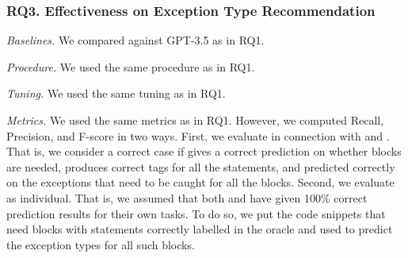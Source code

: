 \subsubsection{RQ3. Effectiveness on Exception Type Recommendation}

{\em Baselines.} We compared {\xtype} against GPT-3.5 as in RQ1.



{\em Procedure.} We used the same procedure as in RQ1.


{\em Tuning.} We used the same tuning as in RQ1.

{\em Metrics.} We used the same metrics as in RQ1. However, we
computed Recall, Precision, and F-score in two ways. First, we
evaluate {\xtype} in connection with {\xblock} and {\xstate}. That is,
we consider a correct case if {\xblock} gives a correct prediction on
whether  blocks are needed, {\xstate} produces correct
tags for all the statements, and {\xtype} predicted correctly on the
exceptions that need to be caught for all the  blocks.
Second, we evaluate {\xtype} as individual. That is, we assumed that
both {\xblock} and {\xstate} have given 100\% correct prediction
results for their own tasks. To do so, we put the code snippets that
need  blocks with statements correctly labelled in the
oracle and used {\xtype} to predict the exception types for all such
blocks.

